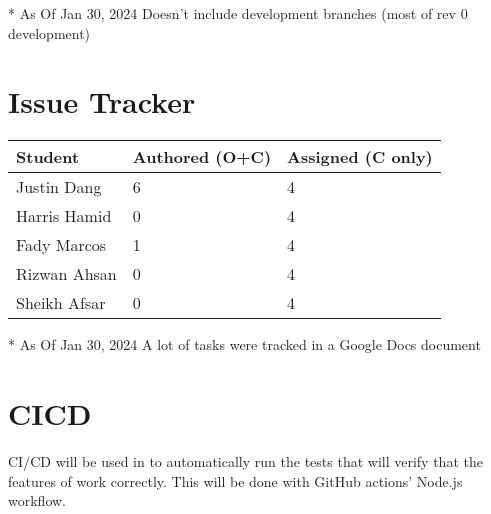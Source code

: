 \documentclass{article}
\begin{document}
* As Of Jan 30, 2024 \newline * Doesn't include development branches (most of rev 0 development)\\

\section{Issue Tracker}


\begin{table}[H]
\centering
\begin{tabular}{lll}
\toprule
\textbf{Student} & \textbf{Authored (O+C)} & \textbf{Assigned (C only)}\\
\midrule
Justin Dang & 6 & 4 \\
Harris Hamid & 0 & 4 \\
Fady Marcos & 1 & 4 \\
Rizwan Ahsan & 0 & 4 \\
Sheikh Afsar & 0 & 4 \\
\bottomrule
\end{tabular}
\end{table}


* As Of Jan 30, 2024 \newline * A lot of tasks were tracked in a Google Docs document



\section{CICD}

CI/CD will be used in \progname{} to automatically run the tests that will verify that the features of \progname{} work correctly. This will be done with GitHub actions' Node.js workflow.


\end{document}
